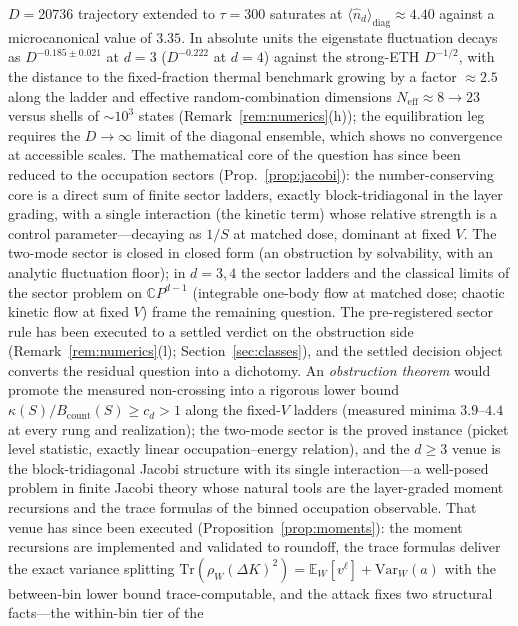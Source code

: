 \begin{enumerate}[leftmargin=1.6em]
$D=20736$ trajectory extended to $\tau=300$ saturates at $\langle\hat
n_{d}\rangle_{\mathrm{diag}}\approx4.40$ against a microcanonical value of $3.35$. In
absolute units the eigenstate fluctuation decays as $D^{-0.185\pm0.021}$ at $d=3$
($D^{-0.222}$ at $d=4$) against the strong-ETH $D^{-1/2}$, with the distance to the
fixed-fraction thermal benchmark growing by a factor $\approx2.5$ along the ladder and
effective random-combination dimensions $N_{\mathrm{eff}}\approx8\to23$ versus shells of
$\sim10^{3}$ states (Remark~\ref{rem:numerics}(h)); the equilibration leg requires the
$D\to\infty$ limit of the diagonal ensemble, which shows no convergence at accessible
scales. The mathematical core of the question has since been reduced to the occupation
sectors (Prop.~\ref{prop:jacobi}): the number-conserving core is a direct sum of
finite sector ladders, exactly block-tridiagonal in the layer grading, with a single
interaction (the kinetic term) whose relative strength is a control parameter---decaying
as $1/S$ at matched dose, dominant at fixed $V$. The two-mode sector is closed in closed
form (an obstruction by solvability, with an analytic fluctuation floor); in $d=3,4$ the
sector ladders and the classical limits of the sector problem on
$\mathbb{C}P^{d-1}$ (integrable one-body flow at matched dose; chaotic kinetic flow at
fixed $V$) frame the remaining question. The pre-registered sector rule has been
executed to a settled verdict on the obstruction side
(Remark~\ref{rem:numerics}(l); Section~\ref{sec:classes}), and the settled decision
object converts the residual question into a dichotomy. An \emph{obstruction theorem}
would promote the measured non-crossing into a rigorous lower bound
$\kappa(S)/B_{\mathrm{count}}(S)\ge c_{d}>1$ along the fixed-$V$ ladders (measured
minima $3.9$--$4.4$ at every rung and realization); the two-mode sector is the proved
instance (picket level statistic, exactly linear occupation--energy relation), and the
$d\ge3$ venue is the block-tridiagonal Jacobi structure with its single
interaction---a well-posed problem in finite Jacobi theory whose natural tools are the
layer-graded moment recursions and the trace formulas of the binned occupation
observable. That venue has since been executed
(Proposition~\ref{prop:moments}): the moment recursions are implemented and
validated to roundoff, the trace formulas deliver the exact variance
splitting
$\mathrm{Tr}(\rho_W(\Delta K)^{2})=\mathbb{E}_W[v^{\ell}]
+\mathrm{Var}_{W}(a)$ with the between-bin lower bound trace-computable,
and the attack fixes two structural facts---the within-bin tier of the

\end{enumerate}
